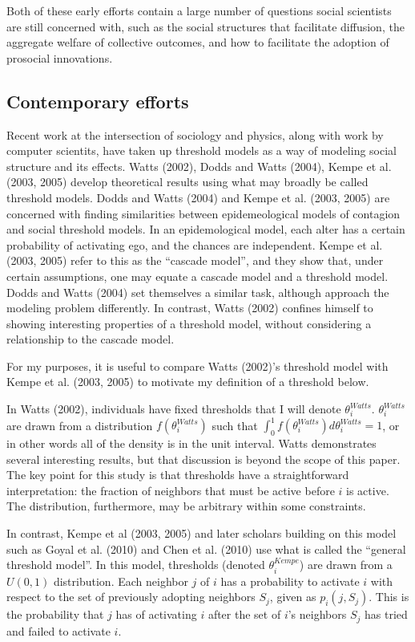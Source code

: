\documentclass{article}
\begin{document}
Both of these early efforts contain a large number of questions social scientists are still concerned with, such as the social structures that facilitate diffusion, the aggregate welfare of collective outcomes, and how to facilitate the adoption of prosocial innovations.

\subsection{Contemporary efforts}

Recent work at the intersection of sociology and physics, along with work by computer scientits, have taken up threshold models as a way of modeling social structure and its effects. Watts (2002), Dodds and Watts (2004), Kempe et al. (2003, 2005) develop theoretical results using what may broadly be called threshold models. Dodds and Watts (2004) and Kempe et al. (2003, 2005) are concerned with finding similarities between epidemeological models of contagion and social threshold models. In an epidemological model, each alter has a certain probability of activating ego, and the chances are independent. Kempe et al. (2003, 2005) refer to this as the ``cascade model'', and they show that, under certain assumptions, one may equate a cascade model and a threshold model. Dodds and Watts (2004) set themselves a similar task, although approach the modeling problem differently. In contrast, Watts (2002) confines himself to showing interesting properties of a threshold model, without considering a relationship to the cascade model.

For my purposes, it is useful to compare Watts (2002)'s threshold model with Kempe et al. (2003, 2005) to motivate my definition of a threshold below.

In Watts (2002), individuals have fixed thresholds that I will denote $\theta_i^{Watts}$. $\theta_i^{Watts}$ are drawn from a distribution $f(\theta_i^{Watts})$ such that $\int_0^1 f(\theta_i^{Watts})d\theta_i^{Watts} = 1$, or in other words all of the density is in the unit interval. Watts demonstrates several interesting results, but that discussion is beyond the scope of this paper. The key point for this study is that thresholds have a straightforward interpretation: the fraction of neighbors that must be active before $i$ is active. The distribution, furthermore, may be arbitrary within some constraints.

In contrast, Kempe et al (2003, 2005) and later scholars building on this model such as Goyal et al. (2010) and Chen et al. (2010) use what is called the ``general threshold model''. In this model, thresholds (denoted $\theta_i^{Kempe}$) are drawn from a $U(0,1)$ distribution. Each neighbor $j$ of $i$ has a probability to activate $i$ with respect to the set of previously adopting neighbors $S_j$, given as $p_i(j, S_j)$. This is the probability that $j$ has of activating $i$ after the set of $i$'s neighbors $S_j$ has tried and failed to activate $i$.
\end{document}
